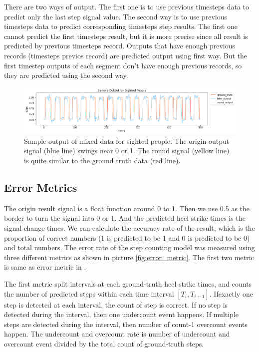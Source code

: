 \documentclass[11pt]{article}
\begin{document}
{There are two ways of output. The first one  is to use previous timesteps data to predict only the last step signal value. The second way is to use previous timesteps data to predict corresponding timesteps step results. The first one cannot predict the first timesteps result, but it is more precise since all result is predicted by previous timesteps record.  Outputs that have enough previous records (timesteps previos record) are predicted output using first way. But the first timestep outputs of each segment don't have enough previous records, so they are predicted using the second way.


\begin{figure}[ht]
\centering
\includegraphics[scale=0.5]{output_sighted}
\caption{Sample output of mixed data for sighted people. The origin output signal (blue line) swings near 0 or 1. The round signal (yellow line) is quite similar to the ground truth data (red line).}
\label{fig:output_sighted}
\end{figure}



\subsection{Error Metrics}

The origin result signal is a float function around 0 to 1. Then we use 0.5 as the border to turn the signal into 0 or 1. And the predicted heel strike times is the signal change times. We can calculate the accuracy rate of the result, which is the proportion of correct numbers (1 is predicted to be 1 and 0 is predicted to be 0) and total numbers. The error rate of the step counting model was measured using three different metrics as shown in picture \ref{fig:error_metric}. The first two metric is same as error metric in \cite{flores2016weallwalk}.

The first metric split intervals at each ground-truth heel strike times, and counts the number of predicted steps within each time interval $[T_i, T_{i+1}]$.  Ifexactly one step is detected at each interval, the count of step is correct. If no step is detected during the interval, then one undercount event happens. If multiple steps are detected during the interval, then number of count-1 overcount events happen. The undercount and overcount rate is number of undercount and overcount event divided by the total count of ground-truth steps.

}
\end{document}
